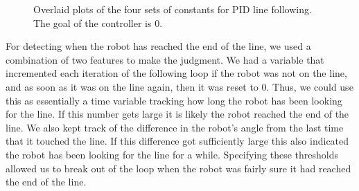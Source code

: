 \documentclass[12pt]{article}
\begin{document}
\begin{figure}
	\hfill
	
	\caption{Overlaid plots of the four sets of constants for PID line following. The goal of the controller is 0.}
	\label{pid_lines}
\end{figure}

For detecting when the robot has reached the end of the line, we used a combination of two features to make the judgment. We had a variable that incremented each iteration of the following loop if the robot was not on the line, and as soon as it was on the line again, then it was reset to 0. Thus, we could use this as essentially a time variable tracking how long the robot has been looking for the line. If this number gets large it is likely the robot reached the end of the line. We also kept track of the difference in the robot's angle from the last time that it touched the line. If this difference got sufficiently large this also indicated the robot has been looking for the line for a while. Specifying these thresholds allowed us to break out of the loop when the robot was fairly sure it had reached the end of the line.
\end{document}
